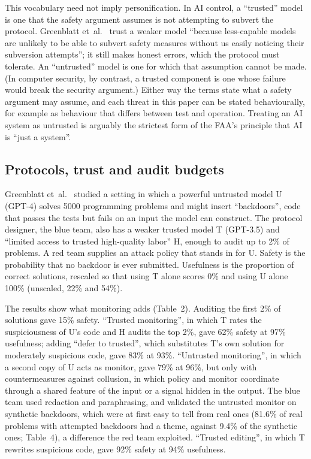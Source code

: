 \documentclass[11pt]{article}
\begin{document}
This vocabulary need not imply personification. In AI control, a ``trusted'' model is one that the safety argument assumes is not attempting to subvert the protocol. Greenblatt et~al.~\cite[Section~2]{greenblatt2023control} trust a weaker model ``because less-capable models are unlikely to be able to subvert safety measures without us easily noticing their subversion attempts''; it still makes honest errors, which the protocol must tolerate. An ``untrusted'' model is one for which that assumption cannot be made. (In computer security, by contrast, a trusted component is one whose failure would break the security argument.) Either way the terms state what a safety argument may assume, and each threat in this paper can be stated behaviourally, for example as behaviour that differs between test and operation. Treating an AI system as untrusted is arguably the strictest form of the FAA's principle that AI is ``just a system''.

\subsection{Protocols, trust and audit budgets}\label{sec:protocols}

Greenblatt et~al.~\cite{greenblatt2023control} studied a setting in which a powerful untrusted model U (GPT-4) solves \num{5000} programming problems and might insert ``backdoors'', code that passes the tests but fails on an input the model can construct. The protocol designer, the blue team, also has a weaker trusted model T (GPT-3.5) and ``limited access to trusted high-quality labor'' H, enough to audit up to 2\% of problems. A red team supplies an attack policy that stands in for U. Safety is the probability that no backdoor is ever submitted. Usefulness is the proportion of correct solutions, rescaled so that using T alone scores 0\% and using U alone 100\% (unscaled, 22\% and 54\%).

The results show what monitoring adds (Table~2). Auditing the first 2\% of solutions gave 15\% safety. ``Trusted monitoring'', in which T rates the suspiciousness of U's code and H audits the top 2\%, gave 62\% safety at 97\% usefulness; adding ``defer to trusted'', which substitutes T's own solution for moderately suspicious code, gave 83\% at 93\%. ``Untrusted monitoring'', in which a second copy of U acts as monitor, gave 79\% at 96\%, but only with countermeasures against collusion, in which policy and monitor coordinate through a shared feature of the input or a signal hidden in the output. The blue team used redaction and paraphrasing, and validated the untrusted monitor on synthetic backdoors, which were at first easy to tell from real ones (81.6\% of real problems with attempted backdoors had a theme, against 9.4\% of the synthetic ones; Table~4), a difference the red team exploited. ``Trusted editing'', in which T rewrites suspicious code, gave 92\% safety at 94\% usefulness.
\end{document}
